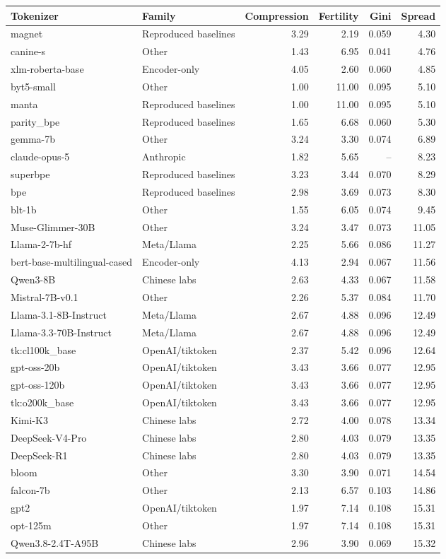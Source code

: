 \begin{tabular}{llrrrr}
\toprule
Tokenizer & Family & Compression & Fertility & Gini & Spread \\
\midrule
magnet & Reproduced baselines & 3.29 & 2.19 & 0.059 & 4.30 \\
canine-s & Other & 1.43 & 6.95 & 0.041 & 4.76 \\
xlm-roberta-base & Encoder-only & 4.05 & 2.60 & 0.060 & 4.85 \\
byt5-small & Other & 1.00 & 11.00 & 0.095 & 5.10 \\
manta & Reproduced baselines & 1.00 & 11.00 & 0.095 & 5.10 \\
parity\_bpe & Reproduced baselines & 1.65 & 6.68 & 0.060 & 5.30 \\
gemma-7b & Other & 3.24 & 3.30 & 0.074 & 6.89 \\
claude-opus-5 & Anthropic & 1.82 & 5.65 & -- & 8.23 \\
superbpe & Reproduced baselines & 3.23 & 3.44 & 0.070 & 8.29 \\
bpe & Reproduced baselines & 2.98 & 3.69 & 0.073 & 8.30 \\
blt-1b & Other & 1.55 & 6.05 & 0.074 & 9.45 \\
Muse-Glimmer-30B & Other & 3.24 & 3.47 & 0.073 & 11.05 \\
Llama-2-7b-hf & Meta/Llama & 2.25 & 5.66 & 0.086 & 11.27 \\
bert-base-multilingual-cased & Encoder-only & 4.13 & 2.94 & 0.067 & 11.56 \\
Qwen3-8B & Chinese labs & 2.63 & 4.33 & 0.067 & 11.58 \\
Mistral-7B-v0.1 & Other & 2.26 & 5.37 & 0.084 & 11.70 \\
Llama-3.1-8B-Instruct & Meta/Llama & 2.67 & 4.88 & 0.096 & 12.49 \\
Llama-3.3-70B-Instruct & Meta/Llama & 2.67 & 4.88 & 0.096 & 12.49 \\
tk:cl100k\_base & OpenAI/tiktoken & 2.37 & 5.42 & 0.096 & 12.64 \\
gpt-oss-20b & OpenAI/tiktoken & 3.43 & 3.66 & 0.077 & 12.95 \\
gpt-oss-120b & OpenAI/tiktoken & 3.43 & 3.66 & 0.077 & 12.95 \\
tk:o200k\_base & OpenAI/tiktoken & 3.43 & 3.66 & 0.077 & 12.95 \\
Kimi-K3 & Chinese labs & 2.72 & 4.00 & 0.078 & 13.34 \\
DeepSeek-V4-Pro & Chinese labs & 2.80 & 4.03 & 0.079 & 13.35 \\
DeepSeek-R1 & Chinese labs & 2.80 & 4.03 & 0.079 & 13.35 \\
bloom & Other & 3.30 & 3.90 & 0.071 & 14.54 \\
falcon-7b & Other & 2.13 & 6.57 & 0.103 & 14.86 \\
gpt2 & OpenAI/tiktoken & 1.97 & 7.14 & 0.108 & 15.31 \\
opt-125m & Other & 1.97 & 7.14 & 0.108 & 15.31 \\
Qwen3.8-2.4T-A95B & Chinese labs & 2.96 & 3.90 & 0.069 & 15.32 \\
\bottomrule
\end{tabular}